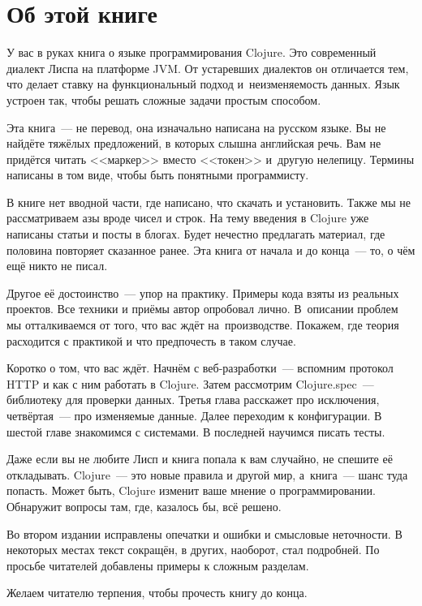 
\section*{Об этой книге}

У вас в руках книга о языке программирования Clojure. Это современный диалект
Лиспа на платформе JVM. От устаревших диалектов он отличается тем, что делает
ставку на функциональный подход и~неизменяемость данных. Язык устроен так, чтобы
решать сложные задачи простым способом.

Эта книга~--- не перевод, она изначально написана на русском языке. Вы не найдёте
тяжёлых предложений, в которых слышна английская речь. Вам не придётся читать
<<маркер>> вместо <<токен>> и~другую нелепицу. Термины написаны в том виде,
чтобы быть понятными программисту.

В книге нет вводной части, где написано, что скачать и установить. Также мы не
рассматриваем азы вроде чисел и строк. На тему введения в Clojure уже написаны
статьи и посты в блогах. Будет нечестно предлагать материал, где половина
повторяет сказанное ранее. Эта книга от начала и до конца~--- то, о чём ещё
никто не писал.

Другое её достоинство~--- упор на практику. Примеры кода взяты из реальных
проектов. Все техники и приёмы автор опробовал лично. В~описании проблем мы
отталкиваемся от того, что вас ждёт на~производстве. Покажем, где теория
расходится с практикой и что предпочесть в таком случае.

Коротко о том, что вас ждёт. Начнём с веб-разработки~--- вспомним протокол HTTP
и как с ним работать в Clojure. Затем рассмотрим Clojure.spec~--- библиотеку для
проверки данных. Третья глава расскажет про исключения, четвёртая~--- про
изменяемые данные. Далее переходим к конфигурации. В шестой главе знакомимся с
системами. В последней научимся писать тесты.

Даже если вы не любите Лисп и книга попала к вам случайно, не спешите её
откладывать. Clojure~--- это новые правила и другой мир, а~книга~--- шанс туда
попасть. Может быть, Clojure изменит ваше мнение о программировании. Обнаружит
вопросы там, где, казалось бы, всё решено.

Во втором издании исправлены опечатки и ошибки и смысловые неточности. В
некоторых местах текст сокращён, в других, наоборот, стал подробней. По просьбе
читателей добавлены примеры к сложным разделам.

Желаем читателю терпения, чтобы прочесть книгу до конца.

